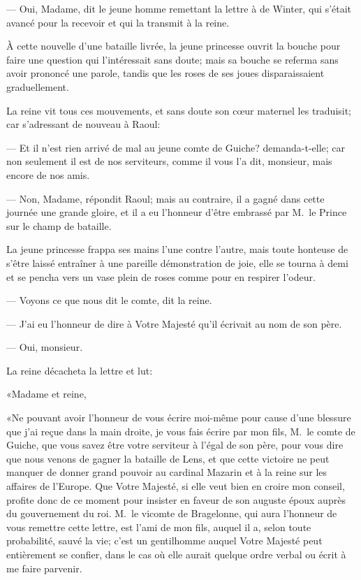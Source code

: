 — Oui, Madame, dit le jeune homme remettant la lettre à de Winter, qui s'était avancé pour la recevoir et qui la transmit à la reine.

À cette nouvelle d'une bataille livrée, la jeune princesse ouvrit la bouche pour faire une question qui l'intéressait sans doute; mais sa bouche se referma sans avoir prononcé une parole, tandis que les roses de ses joues disparaissaient graduellement.

La reine vit tous ces mouvements, et sans doute son cœur maternel les traduisit; car s'adressant de nouveau à Raoul:

— Et il n'est rien arrivé de mal au jeune comte de Guiche? demanda-t-elle; car non seulement il est de nos serviteurs, comme il vous l'a dit, monsieur, mais encore de nos amis.

— Non, Madame, répondit Raoul; mais au contraire, il a gagné dans cette journée une grande gloire, et il a eu l'honneur d'être embrassé par M.~le Prince sur le champ de bataille.

La jeune princesse frappa ses mains l'une contre l'autre, mais toute honteuse de s'être laissé entraîner à une pareille démonstration de joie, elle se tourna à demi et se pencha vers un vase plein de roses comme pour en respirer l'odeur.

— Voyons ce que nous dit le comte, dit la reine.

— J'ai eu l'honneur de dire à Votre Majesté qu'il écrivait au nom de son père.

— Oui, monsieur.

La reine décacheta la lettre et lut:

«Madame et reine,

«Ne pouvant avoir l'honneur de vous écrire moi-même pour cause d'une blessure que j'ai reçue dans la main droite, je vous fais écrire par mon fils, M.~le comte de Guiche, que vous savez être votre serviteur à l'égal de son père, pour vous dire que nous venons de gagner la bataille de Lens, et que cette victoire ne peut manquer de donner grand pouvoir au cardinal Mazarin et à la reine sur les affaires de l'Europe. Que Votre Majesté, si elle veut bien en croire mon conseil, profite donc de ce moment pour insister en faveur de son auguste époux auprès du gouvernement du roi. M.~le vicomte de Bragelonne, qui aura l'honneur de vous remettre cette lettre, est l'ami de mon fils, auquel il a, selon toute probabilité, sauvé la vie; c'est un gentilhomme auquel Votre Majesté peut entièrement se confier, dans le cas où elle aurait quelque ordre verbal ou écrit à me faire parvenir.

